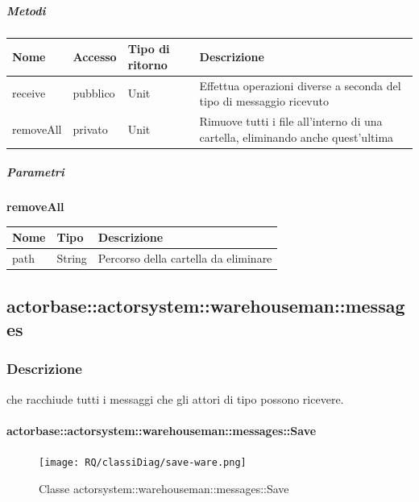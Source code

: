 \documentclass{scalatekids-article}
\begin{document}
\subparagraph{Metodi}
\begin{tabular}{| l | l | l | l |}
  \hline
  Nome & Accesso & Tipo di ritorno & Descrizione\\
  \hline
  receive & pubblico & Unit & Effettua operazioni diverse a seconda del tipo di messaggio ricevuto \\
  \hline
  removeAll & privato & Unit & Rimuove tutti i file all'interno di una cartella, eliminando anche quest'ultima \\
  \hline
\end{tabular}

\subparagraph{Parametri}

\begin{center}
  \textbf{removeAll}\\
\end{center}
\begin{tabular}{| l | l | l |}
  \hline
  Nome & Tipo & Descrizione\\
  \hline
  path & String & Percorso della cartella da eliminare\\
  \hline
\end{tabular}

\subsection{actorbase::actorsystem::warehouseman::messages}
\label{sec:actorbase::actorsystem::warehouseman::messages}

\subsubsection{Descrizione}

 che racchiude tutti i messaggi che gli attori di tipo
 possono ricevere.

\paragraph{actorbase::actorsystem::warehouseman::messages::Save}
\label{sec:actorbase::actorsystem::warehouseman::messages::Save}

\begin{figure}[H]
   \begin{center}
     \texttt{[image: RQ/classiDiag/save-ware.png]}
     \caption{Classe actorsystem::warehouseman::messages::Save}
   \end{center}
 \end{figure}
\end{document}
